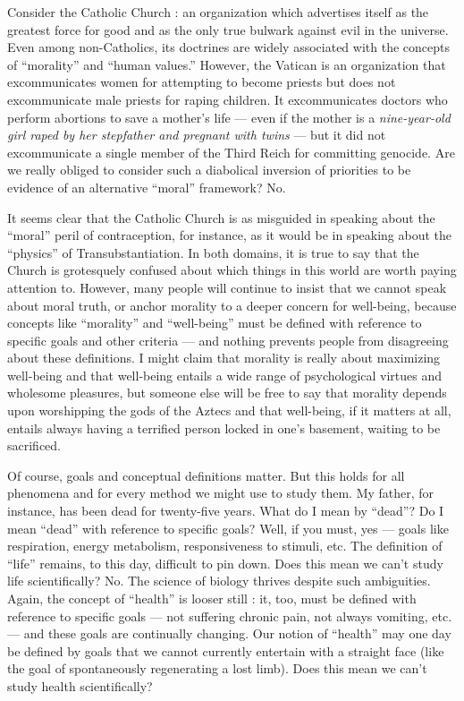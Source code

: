 \documentclass[a4paper,14pt]{extbook}
\begin{document}
Consider the Catholic Church :
an organization which advertises itself as the greatest force for good and as the only true bulwark against evil in the universe.
Even among non-Catholics, its doctrines are widely associated with the concepts of ``morality'' and ``human values.''
However, the Vatican is an organization that excommunicates women for attempting to become priests but does not excommunicate male priests for raping children.
It excommunicates doctors who perform abortions to save a mother's life --- even if the mother is a \textit{nine-year-old girl raped by her stepfather and pregnant with twins} --- but it did not excommunicate a single member of the Third Reich for committing genocide.
Are we really obliged to consider such a diabolical inversion of priorities to be evidence of an alternative ``moral'' framework?
No.

It seems clear that the Catholic Church is as misguided in speaking about the ``moral'' peril of contraception, for instance, as it would be in speaking about the ``physics'' of Transubstantiation.
In both domains, it is true to say that the Church is grotesquely confused about which things in this world are worth paying attention to.
However, many people will continue to insist that we cannot speak about moral truth, or anchor morality to a deeper concern for well-being, because concepts like ``morality'' and ``well-being'' must be defined with reference to specific goals and other criteria --- and nothing prevents people from disagreeing about these definitions.
I might claim that morality is really about maximizing well-being and that well-being entails a wide range of psychological virtues and wholesome pleasures, but someone else will be free to say that morality depends upon worshipping the gods of the Aztecs and that well-being, if it matters at all, entails always having a terrified person locked in one's basement, waiting to be sacrificed.

Of course, goals and conceptual definitions matter.
But this holds for all phenomena and for every method we might use to study them.
My father, for instance, has been dead for twenty-five years.
What do I mean by ``dead''?
Do I mean ``dead'' with reference to specific goals?
Well, if you must, yes --- goals like respiration, energy metabolism, responsiveness to stimuli, etc.
The definition of ``life'' remains, to this day, difficult to pin down.
Does this mean we can't study life scientifically?
No.
The science of biology thrives despite such ambiguities.
Again, the concept of ``health'' is looser still :
it, too, must be defined with reference to specific goals --- not suffering chronic pain, not always vomiting, etc. --- and these goals are continually changing.
Our notion of ``health'' may one day be defined by goals that we cannot currently entertain with a straight face (like the goal of spontaneously regenerating a lost limb).
Does this mean we can't study health scientifically?
\end{document}
